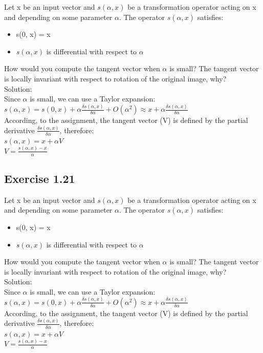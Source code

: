 \documentclass[a4paper, 12pt]{article}
\begin{document}
Let x be an input vector and $s(\alpha, x)$ be a transformation operator acting on x and depending on some parameter $\alpha$. The operator $s(\alpha, x)$ satisfies:
\begin{itemize}
\item s(0, x) = x
\item $s(\alpha, x)$ is differential with respect to $\alpha$
\end{itemize}
How would you compute the tangent vector when $\alpha$ is small? The tangent vector is locally invariant with respect to rotation of the original image, why?\\

Solution:\\

Since $\alpha$ is small, we can use a Taylor expansion: $s(\alpha, x) = s(0, x) + \alpha \frac{\delta s(\alpha, x)}{\delta \alpha} + O(\alpha^2) \approx x + \alpha \frac{\delta s(\alpha, x)}{\delta \alpha}$\\

According, to the assignment, the tangent vector (V) is defined by the partial derivative $\frac{\delta s(\alpha, x)}{\delta \alpha}$, therefore:\\

$s(\alpha, x) =  x + \alpha V$\\

$V = \frac{s(\alpha, x) -  x}{\alpha}$\\


\subsection{Exercise 1.21}
Let x be an input vector and $s(\alpha, x)$ be a transformation operator acting on x and depending on some parameter $\alpha$. The operator $s(\alpha, x)$ satisfies:
\begin{itemize}
\item s(0, x) = x
\item $s(\alpha, x)$ is differential with respect to $\alpha$
\end{itemize}
How would you compute the tangent vector when $\alpha$ is small? The tangent vector is locally invariant with respect to rotation of the original image, why?\\

Solution:\\

Since $\alpha$ is small, we can use a Taylor expansion: $s(\alpha, x) = s(0, x) + \alpha \frac{\delta s(\alpha, x)}{\delta \alpha} + O(\alpha^2) \approx x + \alpha \frac{\delta s(\alpha, x)}{\delta \alpha}$\\

According, to the assignment, the tangent vector (V) is defined by the partial derivative $\frac{\delta s(\alpha, x)}{\delta \alpha}$, therefore:\\

$s(\alpha, x) =  x + \alpha V$\\

$V = \frac{s(\alpha, x) -  x}{\alpha}$\\
\end{document}
